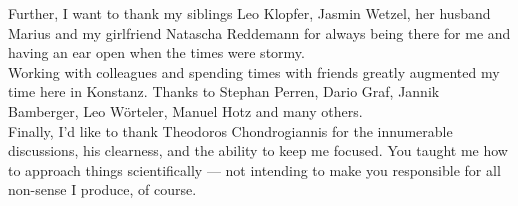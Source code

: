 Further, I want to thank my siblings Leo Klopfer, Jasmin Wetzel, her husband Marius and my girlfriend Natascha Reddemann for always being there for me and having an ear open when the times were stormy. \\

Working with colleagues and spending times with friends greatly augmented my time here in Konstanz. Thanks to Stephan Perren, Dario Graf, Jannik Bamberger, Leo Wörteler, Manuel Hotz and many others. \\


Finally, I'd like to thank Theodoros Chondrogiannis for the innumerable discussions, his clearness, and the ability to keep me focused. 
You taught me how to approach things scientifically --- not intending to make you responsible for all non-sense I produce, of course.
\vfill\hspace{0pt}
\newpage
